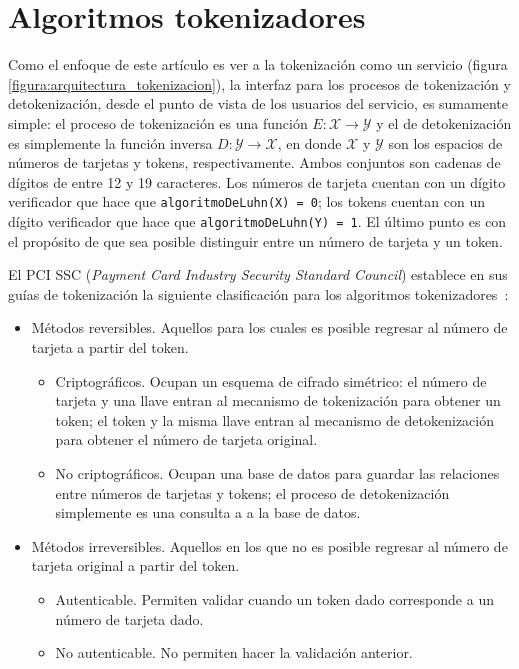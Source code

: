%
%

\section{Algoritmos tokenizadores}

Como el enfoque de este artículo es ver a la tokenización como un servicio
(figura \ref{figura:arquitectura_tokenizacion}), la interfaz para los procesos
de tokenización y detokenización, desde el punto de vista de los usuarios del
servicio, es sumamente simple: el proceso de tokenización es una función $ E:
\mathcal{X} \rightarrow \mathcal{Y} $ y el de detokenización es  simplemente la
función inversa $ D: \mathcal{Y} \rightarrow \mathcal{X} $, en donde $
\mathcal{X} $ y $ \mathcal{Y} $ son los espacios de números de tarjetas y
tokens, respectivamente. Ambos conjuntos son cadenas de dígitos de entre 12 y 19
caracteres. Los números de tarjeta cuentan con un dígito verificador que hace
que \texttt{algoritmoDeLuhn(X) = 0}; los tokens cuentan con un dígito
verificador que hace que \texttt{algoritmoDeLuhn(Y) = 1}. El último punto es con
el propósito de que sea posible distinguir entre un número de tarjeta y un token.

El PCI SSC (\textit{Payment Card Industry Security Standard Council}) establece
en sus guías de tokenización la siguiente clasificación para los algoritmos
tokenizadores~\cite{pci_tokens}:

\begin{itemize}
  \item Métodos reversibles. Aquellos para los cuales es posible regresar al
    número de tarjeta a partir del token.
    \begin{itemize}
      \item Criptográficos. Ocupan un esquema de cifrado simétrico: el número
        de tarjeta y una llave entran al mecanismo de tokenización para obtener
        un token; el token y la misma llave entran al mecanismo de
        detokenización para obtener el número de tarjeta original.
      \item No criptográficos. Ocupan una base de datos para guardar las
        relaciones entre números de tarjetas y tokens; el proceso de
        detokenización simplemente es una consulta a a la base de datos.
    \end{itemize}
  \item Métodos irreversibles. Aquellos en los que no es posible regresar al
    número de tarjeta original a partir del token.
    \begin{itemize}
      \item Autenticable. Permiten validar cuando un token dado corresponde a
        un número de tarjeta dado.
      \item No autenticable. No permiten hacer la validación anterior.
    \end{itemize}
\end{itemize}

